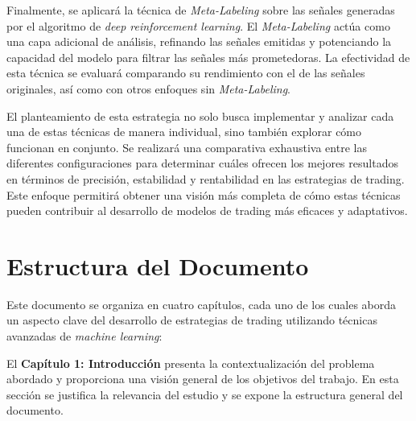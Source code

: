 \documentclass[a4paper,12pt, twoside]{report}
\begin{document}
Finalmente, se aplicará la técnica de \textit{Meta-Labeling} sobre las señales generadas 
por el algoritmo de \textit{deep reinforcement learning}. El \textit{Meta-Labeling} actúa 
como una capa adicional de análisis, refinando las señales emitidas y potenciando la capacidad 
del modelo para filtrar las señales más prometedoras. La efectividad de esta técnica se evaluará 
comparando su rendimiento con el de las señales originales, así como con otros enfoques sin 
\textit{Meta-Labeling}.

El planteamiento de esta estrategia no solo busca implementar y analizar cada una de estas 
técnicas de manera individual, sino también explorar cómo funcionan en conjunto. Se realizará 
una comparativa exhaustiva entre las diferentes configuraciones para determinar cuáles ofrecen 
los mejores resultados en términos de precisión, estabilidad y rentabilidad en las estrategias 
de trading. Este enfoque permitirá obtener una visión más completa de cómo estas técnicas 
pueden contribuir al desarrollo de modelos de trading más eficaces y adaptativos.





\section{Estructura del Documento}

Este documento se organiza en cuatro capítulos, cada uno de los cuales aborda un aspecto 
clave del desarrollo de estrategias de trading utilizando técnicas avanzadas de \textit{machine learning}:

El \textbf{Capítulo 1: Introducción} presenta la contextualización del problema abordado y 
proporciona una visión general de los objetivos del trabajo. En esta sección se justifica la 
relevancia del estudio y se expone la estructura general del documento.
\end{document}
